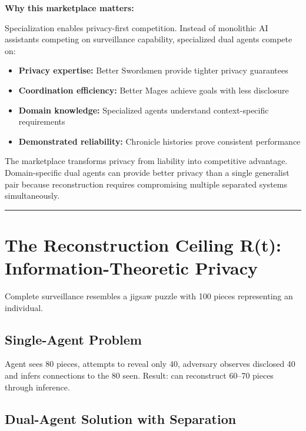\documentclass[
  11pt,
]{article}
\begin{document}
\textbf{Why this marketplace matters:}

Specialization enables privacy-first competition. Instead of monolithic
AI assistants competing on surveillance capability, specialized dual
agents compete on:

\begin{itemize}
\item
  \textbf{Privacy expertise:} Better Swordsmen provide tighter privacy
  guarantees
\item
  \textbf{Coordination efficiency:} Better Mages achieve goals with less
  disclosure
\item
  \textbf{Domain knowledge:} Specialized agents understand
  context-specific requirements
\item
  \textbf{Demonstrated reliability:} Chronicle histories prove
  consistent performance
\end{itemize}

The marketplace transforms privacy from liability into competitive
advantage. Domain-specific dual agents can provide better privacy than a
single generalist pair because reconstruction requires compromising
multiple separated systems simultaneously.

\begin{center}\rule{0.5\linewidth}{0.5pt}\end{center}

\section{The Reconstruction Ceiling R(t): Information-Theoretic
Privacy}\label{the-reconstruction-ceiling-rt-information-theoretic-privacy}

Complete surveillance resembles a jigsaw puzzle with 100 pieces
representing an individual.

\subsection{Single-Agent Problem}\label{single-agent-problem}

Agent sees 80 pieces, attempts to reveal only 40, adversary observes
disclosed 40 and infers connections to the 80 seen. Result: can
reconstruct 60--70 pieces through inference.

\subsection{Dual-Agent Solution with
Separation}\label{dual-agent-solution-with-separation}
\end{document}
